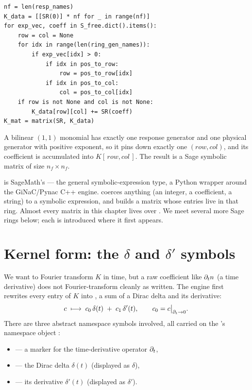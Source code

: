 \begin{lstlisting}
nf = len(resp_names)
K_data = [[SR(0)] * nf for _ in range(nf)]
for exp_vec, coeff in S_free.dict().items():
    row = col = None
    for idx in range(len(ring_gen_names)):
        if exp_vec[idx] > 0:
            if idx in pos_to_row:
                row = pos_to_row[idx]
            if idx in pos_to_col:
                col = pos_to_col[idx]
    if row is not None and col is not None:
        K_data[row][col] += SR(coeff)
K_mat = matrix(SR, K_data)
\end{lstlisting}

A bilinear $(1,1)$ monomial has exactly one response generator and one physical
generator with positive exponent, so it pins down exactly one $(row, col)$, and
its coefficient is accumulated into $K[\,row, col\,]$. The result  is
a Sage symbolic matrix of size $n_f \times n_f$.

\begin{note}
 is SageMath's  --- the general symbolic-expression
type, a Python wrapper around the GiNaC/Pynac C++ engine.  coerces
anything (an integer, a coefficient, a string) to a symbolic expression, and
 builds a matrix whose entries live in that ring. Almost
every matrix in this chapter lives over . We meet several more Sage
rings below; each is introduced where it first appears.
\end{note}

\section{Kernel form: the \texorpdfstring{$\delta$}{delta} and \texorpdfstring{$\delta'$}{delta-prime} symbols}

We want to Fourier transform $K$ in time, but a raw coefficient like $\partial_t n$ (a
time derivative) does not Fourier-transform cleanly as written. The engine first
rewrites every entry of $K$ into , a sum of a Dirac delta and
its derivative:
\begin{equation}
  c \;\longmapsto\; c_0\,\delta(t) \;+\; c_1\,\delta'(t),
  \qquad c_0 = c\big|_{\partial_t \to 0}.
  \label{eq:kernelform}
\end{equation}
There are three abstract namespace symbols involved, all carried on the
's namespace object :

\begin{itemize}
  \item {} --- a marker for the time-derivative operator $\partial_t$,
  \item {} --- the Dirac delta $\delta(t)$ (displayed as $\delta$),
  \item {} --- its derivative $\delta'(t)$ (displayed as $\delta'$).
\end{itemize}

